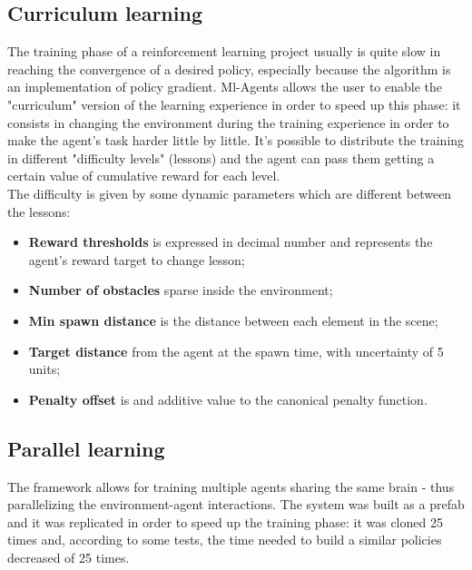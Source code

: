 \documentclass{ifacconf}
\begin{document}
\subsection{Curriculum learning} 
The training phase of a reinforcement learning project usually is quite slow in reaching the convergence of a desired policy, especially because the algorithm is an implementation of policy gradient. Ml-Agents allows the user to enable the "curriculum" version of the learning experience in order to speed up this phase: it consists in changing the environment during the training experience in order to make the agent's task harder little by little. It's possible to distribute the training in different "difficulty levels" (lessons) and the agent can pass them getting a certain value of cumulative reward for each level. \\
The difficulty is given by some dynamic parameters which are different between the lessons:

\begin{itemize}
    \item \textbf{Reward thresholds} is expressed in decimal number and represents the agent's reward target to change lesson;
    \item \textbf{Number of obstacles} sparse inside the environment;
    \item \textbf{Min spawn distance} is the distance between each element in the scene;
    \item \textbf{Target distance} from the agent at the spawn time, with uncertainty of 5 units;
    \item \textbf{Penalty offset} is and additive value to the canonical penalty function.
\end{itemize}

\subsection{Parallel learning}
The framework allows for training multiple agents sharing the same brain - thus parallelizing the environment-agent interactions. The system was built as a prefab and it was replicated in order to speed up the training phase: it was cloned 25 times and, according to some tests, the time needed to build a similar policies decreased of 25 times.
\end{document}
